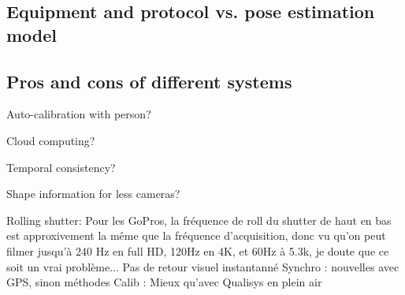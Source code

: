 \subsection{Equipment and protocol vs. pose estimation model}
\blindtext

\subsection{Pros and cons of different systems}

Auto-calibration with person?

Cloud computing?

Temporal consistency?

Shape information for less cameras?

Rolling shutter: Pour les GoPros, la fréquence de roll du shutter de haut en bas est approxivement la même que la fréquence d'acquisition, donc vu qu'on peut filmer jusqu'à 240 Hz en full HD, 120Hz en 4K, et 60Hz à 5.3k, je doute que ce soit un vrai problème...
Pas de retour visuel instantanné
Synchro : nouvelles avec GPS, sinon méthodes
Calib : Mieux qu'avec Qualisys en plein air

\blindtext
